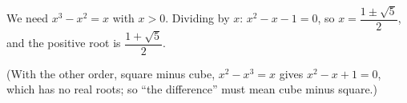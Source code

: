 We need $x^3-x^2=x$ with $x>0$. Dividing by $x$: $x^2-x-1=0$, so $x=\dfrac{1\pm\sqrt5}{2}$, and the positive root is $\boxed{\dfrac{1+\sqrt5}{2}}$.

(With the other order, square minus cube, $x^2-x^3=x$ gives $x^2-x+1=0$, which has no real roots; so ``the difference'' must mean cube minus square.)

